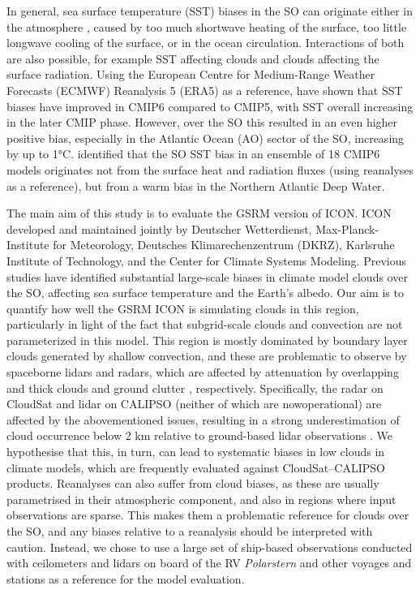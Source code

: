 \documentclass[draft]{agujournal2019}
\begin{document}
In general, sea surface temperature (SST) biases in the SO can originate either
in the atmosphere , caused by too much shortwave heating of
the surface, too little longwave cooling of the surface, or in the ocean
circulation.  Interactions of both are also possible, for example SST affecting
clouds and clouds affecting the surface radiation. Using the European Centre
for Medium-Range Weather Forecasts (ECMWF) Reanalysis 5 (ERA5) as a reference,
 have shown that SST biases have improved in CMIP6 compared to
CMIP5, with SST overall increasing in the later CMIP phase. However, over the
SO this resulted in an even higher positive bias, especially in the Atlantic
Ocean (AO) sector of the SO, increasing by up to 1°C.  
identified that the SO SST bias in an ensemble of 18 CMIP6 models originates
not from the surface heat and radiation fluxes (using reanalyses as a
reference), but from a warm bias in the Northern Atlantic Deep Water.

The main aim of this study is to evaluate the GSRM version of ICON. ICON
developed and maintained jointly by Deutscher Wetterdienst,
Max-Planck-Institute for Meteorology, Deutsches Klimarechenzentrum (DKRZ),
Karlsruhe Institute of Technology, and the Center for Climate Systems Modeling.
Previous studies have identified substantial large-scale biases in climate
model clouds over the SO, affecting sea surface temperature and the Earth’s
albedo. Our aim is to quantify how well the GSRM ICON is simulating clouds in
this region, particularly in light of the fact that subgrid-scale clouds and
convection are not parameterized in this model. This region is mostly dominated
by boundary layer clouds generated by shallow convection, and these are
problematic to observe by spaceborne lidars and radars, which are affected by
attenuation by overlapping and thick clouds  and
ground clutter , respectively.  Specifically, the radar on
CloudSat and lidar on CALIPSO (neither of which are nowoperational) are
affected by the abovementioned issues, resulting in a strong underestimation of
cloud occurrence below 2 km relative to ground-based lidar observations
.  We hypothesise that this, in turn, can lead to
systematic biases in low clouds in climate models, which are frequently
evaluated against CloudSat--CALIPSO products. Reanalyses can also suffer from
cloud biases, as these are usually parametrised in their atmospheric component,
and also in regions where input observations are sparse.  This makes them a
problematic reference for clouds over the SO, and any biases relative to a
reanalysis should be interpreted with caution. Instead, we chose to use a large
set of ship-based observations conducted with ceilometers and lidars on board
of the RV \emph{Polarstern} and other voyages and stations as a reference for
the model evaluation.
\end{document}
